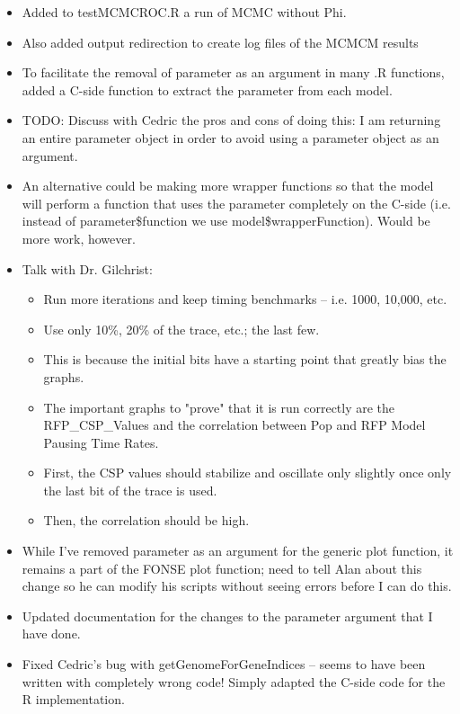 \documentclass[12pt,hyperref]{labbook}
\newcommand{\sep}{\discretionary{}{}{}} %
\begin{document}
\begin{itemize}
    \item Added to testMCMCROC.R a run of MCMC without Phi.
    \item Also added output redirection to create log files of the MCMCM results
    \item To facilitate the removal of parameter as an argument in many .R functions, added a C-side function to extract the parameter from each model.
    \item TODO: Discuss with Cedric the pros and cons of doing this: I am returning an entire parameter object in order to avoid using a parameter object as an argument.
    \item An alternative could be making more wrapper functions so that the model will perform a function that uses the parameter completely on the C-side (i.e. instead of parameter\$function we use model\$wrapperFunction).
    Would be more work, however.
    \item Talk with Dr. Gilchrist:
    \begin{itemize}
        \item Run more iterations and keep timing benchmarks -- i.e. 1000, 10,000, etc.
        \item Use only 10\%, 20\% of the trace, etc.; the last few.
        \item This is because the initial bits have a starting point that greatly bias the graphs.
        \item The important graphs to "prove" that it is run correctly are the RFP\sep \_\sep CSP\sep \_\sep Values and the correlation between Pop and RFP Model Pausing Time Rates.
        \item First, the CSP values should stabilize and oscillate only slightly once only the last bit of the trace is used.
        \item Then, the correlation should be high.
    \end{itemize}
    \item While I've removed parameter as an argument for the generic plot function, it remains a part of the FONSE plot function; need to tell Alan about this change so he can modify his scripts without seeing errors before I can do this.
    \item Updated documentation for the changes to the parameter argument that I have done.
    \item Fixed Cedric's bug with getGenomeForGeneIndices -- seems to have been written with completely wrong code!
    Simply adapted the C-side code for the R implementation.
\end{itemize}
\end{document}
